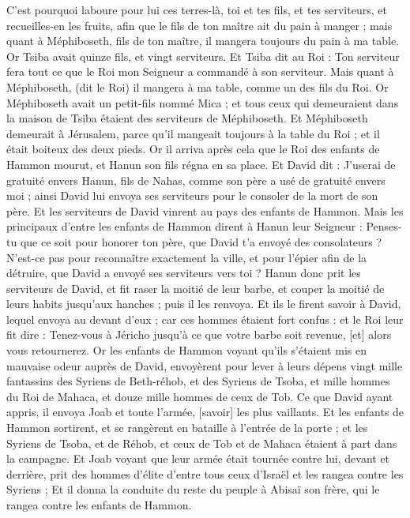 \begin{multicols}{2}
C'est pourquoi laboure pour lui ces terres-là, toi et tes fils, et tes serviteurs, et recueilles-en les fruits, afin que le fils de ton maître ait du pain à manger ; mais quant à Méphiboseth, fils de ton maître, il mangera toujours du pain à ma table. Or Tsiba avait quinze fils, et vingt serviteurs.
Et Tsiba dit au Roi : Ton serviteur fera tout ce que le Roi mon Seigneur a commandé à son serviteur. Mais quant à Méphiboseth, (dit le Roi) il mangera à ma table, comme un des fils du Roi.
Or Méphiboseth avait un petit-fils nommé Mica ; et tous ceux qui demeuraient dans la maison de Tsiba étaient des serviteurs de Méphiboseth.
Et Méphiboseth demeurait à Jérusalem, parce qu'il mangeait toujours à la table du Roi ; et il était boiteux des deux pieds.
\VerseOne{}Or il arriva après cela que le Roi des enfants de Hammon mourut, et Hanun son fils régna en sa place.
Et David dit : J'userai de gratuité envers Hanun, fils de Nahas, comme son père a usé de gratuité envers moi ; ainsi David lui envoya ses serviteurs pour le consoler de la mort de son père. Et les serviteurs de David vinrent au pays des enfants de Hammon.
Mais les principaux d'entre les enfants de Hammon dirent à Hanun leur Seigneur : Penses-tu que ce soit pour honorer ton père, que David t'a envoyé des consolateurs ? N'est-ce pas pour reconnaître exactement la ville, et pour l'épier afin de la détruire, que David a envoyé ses serviteurs vers toi ?
Hanun donc prit les serviteurs de David, et fit raser la moitié de leur barbe, et couper la moitié de leurs habits jusqu'aux hanches ; puis il les renvoya.
Et ils le firent savoir à David, lequel envoya au devant d'eux ; car ces hommes étaient fort confus : et le Roi leur fit dire : Tenez-vous à Jéricho jusqu'à ce que votre barbe soit revenue, [et] alors vous retournerez.
Or les enfants de Hammon voyant qu'ils s'étaient mis en mauvaise odeur auprès de David, envoyèrent pour lever à leurs dépens vingt mille fantassins des Syriens de Beth-réhob, et des Syriens de Tsoba, et mille hommes du Roi de Mahaca, et douze mille hommes de ceux de Tob.
Ce que David ayant appris, il envoya Joab et toute l'armée, [savoir] les plus vaillants.
Et les enfants de Hammon sortirent, et se rangèrent en bataille à l'entrée de la porte ; et les Syriens de Tsoba, et de Réhob, et ceux de Tob et de Mahaca étaient à part dans la campagne.
Et Joab voyant que leur armée était tournée contre lui, devant et derrière, prit des hommes d'élite d'entre tous ceux d'Israël et les rangea contre les Syriens ;
Et il donna la conduite du reste du peuple à Abisaï son frère, qui le rangea contre les enfants de Hammon.

\end{multicols}
